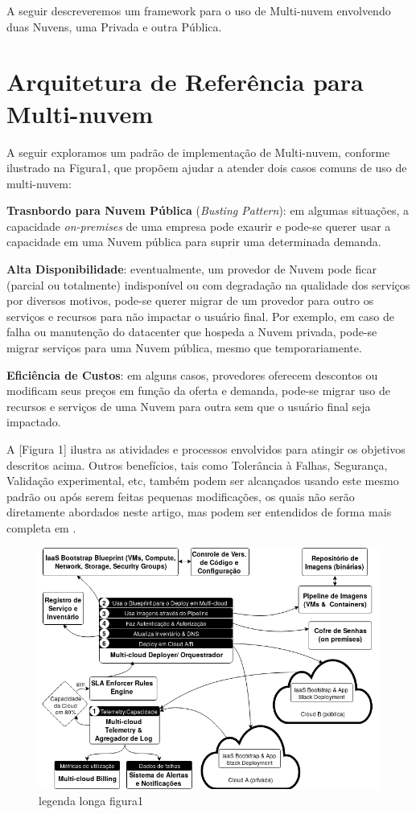 \documentclass[12pt]{article}
\begin{document}
	A seguir descreveremos um framework para o uso de Multi-nuvem envolvendo duas Nuvens, uma Privada e outra Pública. 
	
	
	
	\section{Arquitetura de Referência para Multi-nuvem}
	
	A seguir exploramos um padrão de implementação de Multi-nuvem, conforme ilustrado na Figura1, que propõem ajudar a atender dois casos comuns de uso de multi-nuvem:
	
	\textbf{Trasnbordo para Nuvem Pública} (\textit{Busting Pattern}): em algumas situações, a capacidade \textit{on-premises} de uma empresa pode exaurir e pode-se querer usar a capacidade em uma Nuvem pública para suprir uma determinada demanda.
	
	\textbf{Alta Disponibilidade}: eventualmente, um provedor de Nuvem pode ficar (parcial ou totalmente) indisponível ou com degradação na qualidade dos serviços por diversos motivos, pode-se querer migrar de um provedor para outro os serviços e recursos para não impactar o usuário final. Por exemplo, em caso de falha ou manutenção do datacenter que hospeda a Nuvem privada, pode-se migrar serviços para uma Nuvem pública, mesmo que temporariamente.
	   
	\textbf{Eficiência de Custos}: em alguns casos, provedores oferecem descontos ou modificam seus preços em função da oferta e demanda, pode-se migrar uso de recursos e serviços de uma Nuvem para outra sem que o usuário final seja impactado.
	
	A [Figura 1] ilustra as atividades e processos envolvidos para atingir os objetivos descritos acima. Outros benefícios, tais como Tolerância à Falhas, Segurança, Validação experimental, etc, também podem ser alcançados usando este mesmo padrão ou após serem feitas pequenas modificações, os quais não serão diretamente abordados neste artigo, mas podem ser entendidos de forma mais completa em \cite{Fisher:2018}.
		
	\begin{figure}[H]
		\centering
		\includegraphics[width=0.9\linewidth]{figuras/Figure1.png}
		\caption{legenda longa figura1}
		\label{fig:figure1}
	\end{figure}
	
\end{document}
